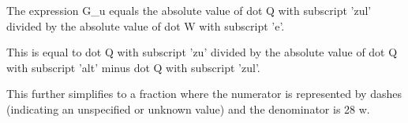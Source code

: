 The expression G_u equals the absolute value of dot Q with subscript 'zul' divided by the absolute value of dot W with subscript 'e'.

This is equal to dot Q with subscript 'zu' divided by the absolute value of dot Q with subscript 'alt' minus dot Q with subscript 'zul'.

This further simplifies to a fraction where the numerator is represented by dashes (indicating an unspecified or unknown value) and the denominator is 28 w.